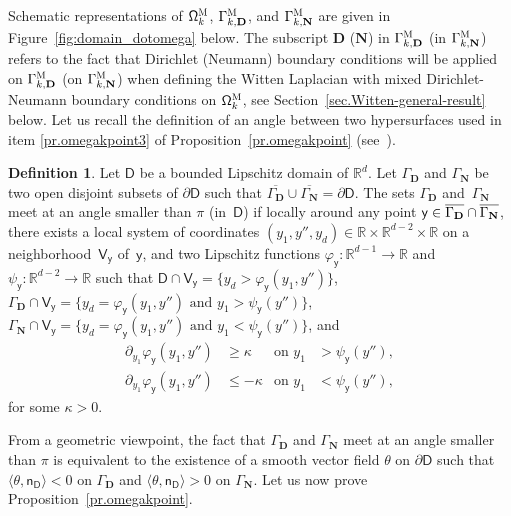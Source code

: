 \documentclass[10pt]{amsart}
\newcommand{\mbf}[1]{\mathbf{#1}}
\let\pa\partial
\theoremstyle{plain}
\theoremstyle{definition}
\newtheorem{definition}[proposition]{Definition}
\begin{document}
Schematic representations of $\mathsf \Omega_k^{\textsc{M}}$, $\Gamma_{k,\mbf D}^{\textsc{M}}$, and $\Gamma_{k,\mbf N}^{\textsc{M}}$ are given in Figure~\ref{fig:domain_dotomega} below.
The subscript $\mbf D$ (\resp $\mbf N$) in $\Gamma_{k,\mbf D}^{\textsc{M}}$ (\resp in $\Gamma_{k,\mbf N}^{\textsc{M}}$) refers to the fact that Dirichlet (\resp Neumann) boundary conditions will be applied on $\Gamma_{k,\mbf D}^{\textsc{M}}$ (\resp on $\Gamma_{k,\mbf N}^{\textsc{M}}$) when defining the Witten Laplacian with mixed Dirichlet-Neumann boundary conditions on $\mathsf \Omega_k^{\textsc{M}}$, see Section~\ref{sec.Witten-general-result} below.
Let us recall the definition of an angle between two hypersurfaces used in item \eqref{pr.omegakpoint3} of Proposition~\ref{pr.omegakpoint} (see~\cite{brown-94,jakab-mitrea-mitrea-09}).


\begin{definition}\label{de.angle}
Let $\mathsf D$ be a bounded Lipschitz domain of $\mathbb R^d$. Let $\Gamma_{\mbf D}$
and $\Gamma_{\mbf N}$ be two open disjoint subsets of $\partial \mathsf D$ such that $\overline{\Gamma_{\mbf D}} \cup \overline{\Gamma_{\mbf N}} = \pa
\mathsf D$.
The sets $\Gamma_{\mbf D}$ and~$\Gamma_{\mbf N}$ meet at an angle smaller than
$\pi$ (in~$\mathsf D$) if locally around any point
$\mathsf y \in \overline{\Gamma_{\mbf D}} \cap\nobreak \overline{\Gamma_{\mbf N}}$, there exists a local system of coordinates $(y_1,y'',y_d) \in \mathbb R
\times \mathbb R^{d-2} \times \mathbb R$ on a
neighborhood~$\mathsf V_{\mathsf y}$ of~$\mathsf y$, and two Lipschitz functions
$\varphi_{\mathsf y}:\mathbb R^{d-1} \to \mathbb R$ and $ \psi_{\mathsf y}:\mathbb R^{d-2} \to \mathbb R$ such
that $\mathsf D \cap \mathsf V_{\mathsf y}=\{y_d > \varphi_{\mathsf y}(y_1,y'')\}$, $\Gamma_{\mbf D} \cap
\mathsf V_{\mathsf y}=\{y_d= \varphi_{\mathsf y}(y_1,y'') \text{ and } y_1 > \psi_{\mathsf y}(y'')\}$, \hbox{$\Gamma_{\mbf N} \cap
\mathsf V_{\mathsf y}=\{y_d= \varphi_{\mathsf y}(y_1,y'') \text{ and } y_1 < \psi_{\mathsf y}(y'')\}$}, and
\[
\begin{aligned}
\partial_{y_1} \varphi_{\mathsf y} (y_1,y'') &\ge \kappa &\text{on }
y_1&>\psi_{\mathsf y}(y''),\\
\partial_{y_1} \varphi_{\mathsf y} (y_1,y'') &\le -\kappa &\text{on }
y_1&<\psi_{\mathsf y}(y''),
\end{aligned}
\]
for some $\kappa>0$.
\end{definition}
From a geometric viewpoint, the fact that $\Gamma_{\mbf D}$ and $\Gamma_{\mbf N}$ meet at an angle smaller than
$\pi$ is equivalent to the existence of a
smooth vector field $\theta$ on $\partial \mathsf D$ such that
$\langle \theta, \mathsf n_{\mathsf D} \rangle < 0$ on $\Gamma_{\mbf D}$ and $\langle \theta,
\mathsf n_{\mathsf D}\rangle > 0$ on
$\Gamma_{\mbf N}$.
Let us now prove Proposition~\ref{pr.omegakpoint}.
\end{document}
